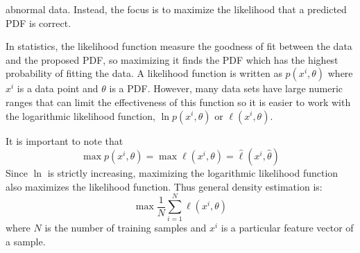 \documentclass[10pt,a4paper]{report}
\begin{document}
					abnormal data. Instead, the focus is to maximize the likelihood that a predicted PDF is correct. \par
					In statistics, the likelihood function measure the goodness of fit between the data and the proposed PDF, so maximizing it finds the PDF which
					has the highest probability of fitting the data.
					A likelihood function is written as $p(x^i,\theta)$ where $x^i$ is a data point and $\theta$ is a PDF.
					However, many data sets have large  numeric ranges that can limit the effectiveness of this function so it is easier to work with the
					logarithmic likelihood function, $\ln p(x^i,\theta)$ or $\ell(x^i,\theta)$. \par
					It is important to note that
					\begin{equation}
						\max p(x^i,\theta) = \max \ell(x^i,\theta) = \widehat{\ell}(x^i, \widehat{\theta})
					\end{equation}
					Since $\ln$ is strictly increasing, maximizing the logarithmic likelihood function also maximizes the likelihood function. Thus general density estimation \autocite[p. 4]{SurveyOfOptimizationMethods} is:
					\begin{equation}
						\max \frac{1}{N} \sum_{i=1}^N \ell(x^i,\theta)
					\end{equation}
					where $N$ is the number of training samples and $x^i$ is a particular feature vector of a sample.
\end{document}
